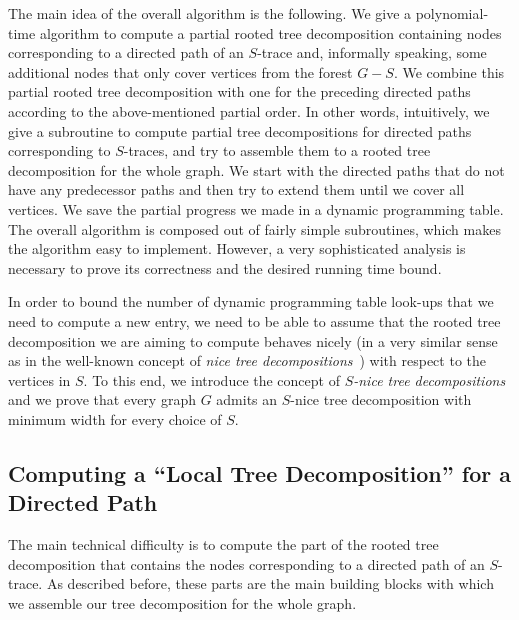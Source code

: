 \documentclass[a4paper,UKenglish,cleveref, autoref, thm-restate, numberwithinsect]{lipics-v2021}
\newcounter{algorithm}
\begin{document}
The main idea of the overall algorithm is the following. We give a polynomial-time algorithm to compute a partial rooted tree decomposition containing nodes corresponding to a directed path of an $S$-trace and, informally speaking, some additional nodes that only cover vertices from the forest $G-S$.
We combine this partial rooted tree decomposition with one for the preceding directed paths according to the above-mentioned partial order. In other words, intuitively, we give a subroutine to compute partial tree decompositions for directed paths corresponding to $S$-traces, and try to assemble them to a rooted tree decomposition for the whole graph. We start with the directed paths that do not have any predecessor paths and then try to extend them until we cover all vertices. We save the partial progress we made in a dynamic programming table. The overall algorithm is composed out of fairly simple subroutines, which makes the algorithm easy to implement. However, a very sophisticated analysis is necessary to prove its correctness and the desired running time bound.

In order to bound the number of dynamic programming table look-ups that we need to compute a new entry, we need to be able to assume that the rooted tree decomposition we are aiming to compute behaves nicely (in a very similar sense as in the well-known concept of \emph{nice tree decompositions}~\cite{bodlaender1996efficient}) with respect to the vertices in $S$. To this end, we introduce the concept of \emph{$S$-nice tree decompositions} and we prove that every graph $G$ admits an $S$-nice tree decomposition with minimum width for every choice of $S$. 

\subsection{Computing a ``Local Tree Decomposition'' for a Directed Path}

The main technical difficulty is to compute the part of the rooted tree decomposition that contains the nodes corresponding to a directed path of an $S$-trace. As described before, these parts are the main building blocks with which we assemble our tree decomposition for the whole graph. 
\end{document}
